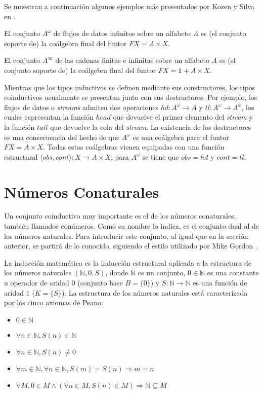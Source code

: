 Se muestran a continuación algunos ejemplos más presentados por Kozen y Silva en \cite{kozen:2017}.

\begin{ejemplo}
El conjunto $A^{\omega}$ de flujos de datos infinitos sobre un alfabeto $A$ es (el conjunto soporte de) la coálgebra final del funtor $\mathit{F}X = A \times X$.
\end{ejemplo}

\begin{ejemplo}
El conjunto $A^{\infty}$ de las cadenas finitas e infinitas sobre un alfabeto $A$ es (el conjunto soporte de) la coálgebra final del funtor $\mathit{F}X = \mathds{1} + A \times X$.
\end{ejemplo}

Mientras que los tipos inductivos se definen mediante sus constructores, los tipos coinductivos usualmente se presentan junto con sus destructores. Por ejemplo, los flujos de datos o \textit{streams} admiten dos operaciones $hd: A^{\omega} \rightarrow A$ y $tl : A^{\omega} \rightarrow A^{\omega}$, los cuales representan la función $head$ que devuelve el primer elemento del \textit{stream} y la función $tail$ que devuelve la cola del \textit{stream}. La existencia de los destructores es una consecuencia del hecho de que $A^{\omega}$ es una coálgebra para el funtor $\mathit{F}X = A \times X$. Todas estas coálgebras vienen equipadas con una función estructural $\langle obs, cont \rangle  : X \rightarrow A \times X$; para $A^{\omega}$ se tiene que $obs = hd$ y $cont = tl$.

\section{Números Conaturales}\label{delay:conat}

Un conjunto coinductivo muy importante es el de los números conaturales, también llamados conúmeros. Como su nombre lo indica, es el conjunto dual al de los números naturales. Para introducir este conjunto, al igual que en la sección anterior, se partirá de lo conocido, siguiendo el estilo utilizado por Mike Gordon \cite{gordon:2017}.

La inducción matemática es la inducción estructural aplicada a la estructura de los números naturales $(\mathbb{N},0,S)$, donde $\mathbb{N}$ es un conjunto, $0 \in \mathbb{N}$ es una constante u operador de aridad $0$ (conjunto base $B = \{0\}$) y $S : \mathbb{N} \rightarrow \mathbb{N}$ es una función de aridad $1$ ($K = \{S\}$). La estructura de los números naturales está caracterizada por los cinco axiomas de Peano:
\begin{itemize}
\item $0 \in \mathbb{N}$
\item $\forall n \in \mathbb{N}, S(n) \in \mathbb{N}$
\item $\forall n \in \mathbb{N}, S(n) \neq 0$
\item $\forall m \in \mathbb{N}, \forall n \in \mathbb{N}, S(m) = S(n) \Rightarrow m = n$
\item $\forall M, 0 \in M \land (\forall n \in M, S(n) \in M) \Rightarrow \mathbb{N} \subseteq M$
\end{itemize}

